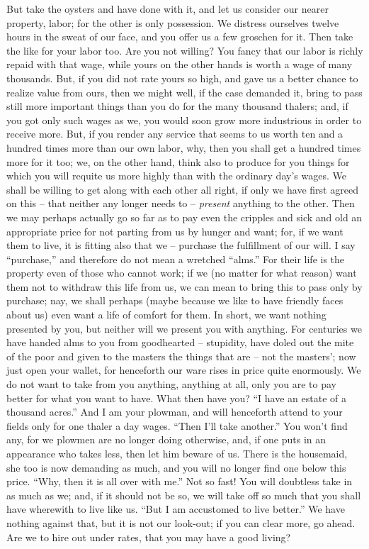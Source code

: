 But take the oysters and have done with it, and let us consider our nearer 
property, labor; for the other is only possession. We distress ourselves 
twelve hours in the sweat of our face, and you offer us a few groschen for it. 
Then take the like for your labor too. Are you not willing? You fancy that our 
labor is richly repaid with that wage, while yours on the other hands is worth 
a wage of many thousands. But, if you did not rate yours so high, and gave us 
a better chance to realize value from ours, then we might well, if the case 
demanded it, bring to pass still more important things than you do for the 
many thousand thalers; and, if you got only such wages as we, you would soon 
grow more industrious in order to receive more. But, if you render any service 
that seems to us worth ten and a hundred times more than our own labor, why, 
then you shall get a hundred times more for it too; we, on the other hand, 
think also to produce for you things for which you will requite us more highly 
than with the ordinary day's wages. We shall be willing to get along with each 
other all right, if only we have first agreed on this -- that neither any 
longer needs to -- \textit{present} anything to the other. Then we may perhaps 
actually go so far as to pay even the cripples and sick and old an appropriate 
price for not parting from us by hunger and want; for, if we want them to 
live, it is fitting also that we -- purchase the fulfillment of our will. I 
say ``purchase,'' and therefore do not mean a wretched ``alms.'' For their 
life is the property even of those who cannot work; if we (no matter for what 
reason) want them not to withdraw this life from us, we can mean to bring this 
to pass only by purchase; nay, we shall perhaps (maybe because we like to have 
friendly faces about us) even want a life of comfort for them. In short, we 
want nothing presented by you, but neither will we present you with anything. 
For centuries we have handed alms to you from goodhearted -- stupidity, have 
doled out the mite of the poor and given to the masters the things that are -- 
not the masters'; now just open your wallet, for henceforth our ware rises in 
price quite enormously. We do not want to take from you anything, anything at 
all, only you are to pay better for what you want to have. What then have you? 
``I have an estate of a thousand acres.'' And I am your plowman, and will 
henceforth attend to your fields only for one thaler a day wages. ``Then I'll 
take another.'' You won't find any, for we plowmen are no longer doing 
otherwise, and, if one puts in an appearance who takes less, then let him 
beware of us. There is the housemaid, she too is now demanding as much, and 
you will no longer find one below this price. ``Why, then it is all over with 
me.'' Not so fast! You will doubtless take in as much as we; and, if it 
should not be so, we will take off so much that you shall have wherewith to 
live like us. ``But I am accustomed to live better.'' We have nothing 
against that, but it is not our look-out; if you can clear more, go ahead. Are 
we to hire out under rates, that you may have a good living?


